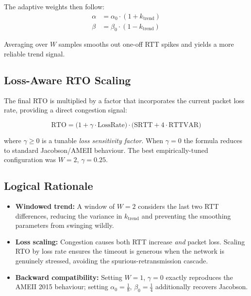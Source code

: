 \documentclass[12pt,a4paper]{report}
\begin{document}
The adaptive weights then follow:
\begin{align}
  \alpha &= \alpha_0 \cdot (1 + k_\text{trend}) \label{eq:alpha-prop} \\
  \beta  &= \beta_0  \cdot (1 - k_\text{trend}) \label{eq:beta-prop}
\end{align}

Averaging over $W$ samples smooths out one-off RTT spikes and yields a more
reliable trend signal.

\subsection{Loss-Aware RTO Scaling}

The final RTO is multiplied by a factor that incorporates the current packet
loss rate, providing a direct congestion signal:

\begin{equation}
  \text{RTO} = \bigl(1 + \gamma \cdot \text{LossRate}\bigr)
               \cdot \bigl(\text{SRTT} + 4 \cdot \text{RTTVAR}\bigr)
  \label{eq:rto-prop}
\end{equation}

\noindent where $\gamma \geq 0$ is a tunable \emph{loss sensitivity factor}.
When $\gamma = 0$ the formula reduces to standard Jacobson/AMEII behaviour.
The best empirically-tuned configuration was $W = 2$, $\gamma = 0.25$.

\subsection{Logical Rationale}

\begin{itemize}
  \item \textbf{Windowed trend:} A window of $W=2$ considers the last two
        RTT differences, reducing the variance in $k_\text{trend}$ and
        preventing the smoothing parameters from swinging wildly.
  \item \textbf{Loss scaling:} Congestion causes both RTT increase
        \emph{and} packet loss.  Scaling RTO by loss rate ensures the timeout
        is generous when the network is genuinely stressed, avoiding the
        spurious-retransmission cascade.
  \item \textbf{Backward compatibility:} Setting $W=1$, $\gamma=0$ exactly
        reproduces the AMEII 2015 behaviour; setting $\alpha_0 = \tfrac{1}{8}$,
        $\beta_0 = \tfrac{1}{4}$ additionally recovers Jacobson.
\end{itemize}
\end{document}
